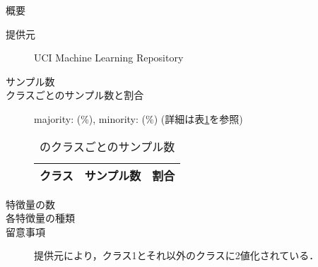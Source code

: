 \begin{description}
    \item[概要] \cite{}
    \item[提供元] UCI Machine Learning Repository
    \item[サンプル数] 
    \item[クラスごとのサンプル数と割合] majority:  (\%), minority:  (\%) (詳細は表\ref{tab:}を参照)

        \begin{table}
            \centering
            \caption{のクラスごとのサンプル数}
            \label{tab:}
            \begin{tabular}{lrc} \hline
                \multicolumn{1}{c}{クラス}&
                \multicolumn{1}{c}{サンプル数}&
                \multicolumn{1}{c}{割合}\\
                \hline
                \hline

                \hline
            \end{tabular}
        \end{table}

    \item[特徴量の数] 
    \item[各特徴量の種類] \mbox{}
        
    \item[留意事項] 提供元により，クラス1とそれ以外のクラスに2値化されている．
\end{description}

\newpage